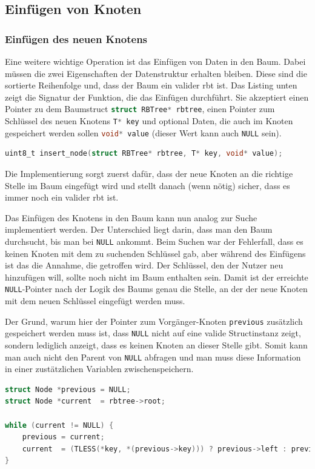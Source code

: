 \documentclass[11pt]{article}
\newcommand{\lstin}[1]{\lstinline[language=C]{#1}}
\begin{document}
\subsection{Einfügen von Knoten}

\subsubsection{Einfügen des neuen Knotens}
Eine weitere wichtige Operation ist das Einfügen von Daten in den Baum. Dabei müssen die zwei Eigenschaften der Datenstruktur erhalten bleiben. Diese sind die sortierte Reihenfolge und, dass der Baum ein valider \gls{rbt} ist.
Das Listing unten zeigt die Signatur der Funktion, die das Einfügen durchführt. Sie akzeptiert einen Pointer zu dem Baumstruct \lstin{struct RBTree* rbtree}, einen Pointer zum Schlüssel des neuen Knotens \lstin{T* key} und optional Daten, die auch im Knoten gespeichert werden sollen \lstin{void* value} (dieser Wert kann auch \lstin{NULL} sein).

\begin{lstlisting}[language=C]
uint8_t insert_node(struct RBTree* rbtree, T* key, void* value);
\end{lstlisting}

Die Implementierung sorgt zuerst dafür, dass der neue Knoten an die richtige Stelle im Baum eingefügt wird und stellt danach (wenn nötig) sicher, dass es immer noch ein valider \gls{rbt} ist.

Das Einfügen des Knotens in den Baum kann nun analog zur Suche implementiert werden.
Der Unterschied liegt darin, dass man den Baum durchsucht, bis man bei \lstin{NULL} ankommt.
Beim Suchen war der Fehlerfall, dass es keinen Knoten mit dem zu suchenden Schlüssel gab, aber während des Einfügens ist das die Annahme, die getroffen wird.
Der Schlüssel, den der Nutzer neu hinzufügen will, sollte noch nicht im Baum enthalten sein. Damit ist der erreichte \lstin{NULL}-Pointer nach der Logik des Baums genau die Stelle, an der der neue Knoten mit dem neuen Schlüssel eingefügt werden muss.

Der Grund, warum hier der Pointer zum Vorgänger-Knoten \lstin{previous} zusätzlich gespeichert werden muss ist,
dass \lstin{NULL} nicht auf eine valide Structinstanz zeigt, sondern lediglich anzeigt, dass es keinen Knoten an dieser Stelle gibt.
Somit kann man auch nicht den Parent von \lstin{NULL} abfragen und man muss diese Information in einer zustätzlichen Variablen zwischenspeichern.

\begin{lstlisting}[language=C]
struct Node *previous = NULL;
struct Node *current  = rbtree->root;

while (current != NULL) {
    previous = current;
    current  = (TLESS(*key, *(previous->key))) ? previous->left : previous->right;
}
\end{lstlisting}
\end{document}
